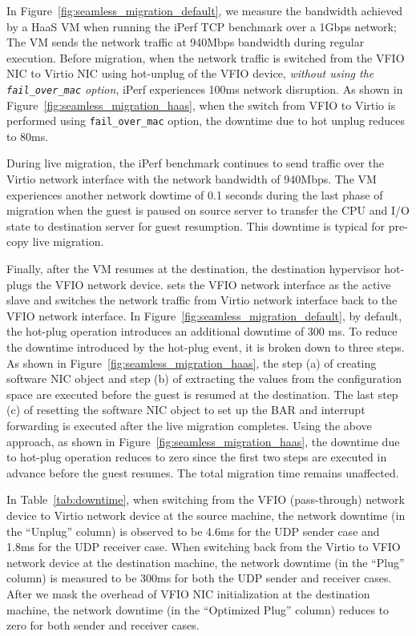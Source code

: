 In Figure~\ref{fig:seamless_migration_default}, we measure 
the bandwidth achieved by a HaaS VM 
when running the iPerf TCP benchmark over a 1Gbps network;
The VM sends the network traffic at 940Mbps bandwidth 
during regular execution. Before migration, when the network traffic is 
switched from the VFIO NIC to Virtio NIC using hot-unplug of the VFIO device, 
{\em without using the \texttt{fail\_over\_mac} option},
iPerf experiences 100ms network disruption.
As shown in Figure~\ref{fig:seamless_migration_haas},
when the switch from VFIO to Virtio is performed
using \texttt{fail\_over\_mac} option, 
the downtime due to hot unplug reduces to 80ms.

During live migration, the iPerf benchmark continues 
to send traffic over the Virtio network interface
with the network bandwidth of 940Mbps.
The VM experiences another network dowtime of 
0.1 seconds during the last phase of migration 
when the guest is paused on source server
to transfer the CPU and I/O state to destination server 
for guest resumption. This downtime is typical for pre-copy live migration.

Finally, after the VM resumes at the destination, the
destination hypervisor hot-plugs the VFIO network device. 
\na sets the VFIO network interface as the active slave and
switches the network traffic from Virtio network interface
back to the VFIO network interface. 
In Figure~\ref{fig:seamless_migration_default}, by default, 
the hot-plug operation introduces an additional downtime 
of 300 ms.
To reduce the downtime introduced by
the hot-plug event, it is broken down to three steps.
As shown in Figure~\ref{fig:seamless_migration_haas}, 
the step (a) of creating software NIC object 
and step (b) of extracting the values from the 
configuration space are executed before the guest 
is resumed at the destination. The last step (c) 
of resetting the software NIC object to set up the BAR and 
interrupt forwarding is executed after 
the live migration completes. 
Using the above  approach, as shown in Figure~\ref{fig:seamless_migration_haas},
the downtime due to hot-plug operation reduces to zero
since the first two steps are executed in advance 
before the guest resumes.
The total migration time remains unaffected.

In Table~\ref{tab:downtime}, when switching
from the VFIO (pass-through) network device to Virtio network device
at the source machine, the network downtime (in the ``Unplug'' column)
is observed to be 4.6ms for the UDP sender case and 1.8ms for the  UDP receiver case. 
When switching back from the Virtio to  VFIO network device at the destination
machine, the network downtime (in the ``Plug'' column)
is measured to be 300ms for both the UDP sender and receiver cases. 
After we mask the overhead of VFIO NIC
initialization at the destination machine,
the network downtime (in the ``Optimized Plug'' column) reduces to zero for both sender and receiver cases.

